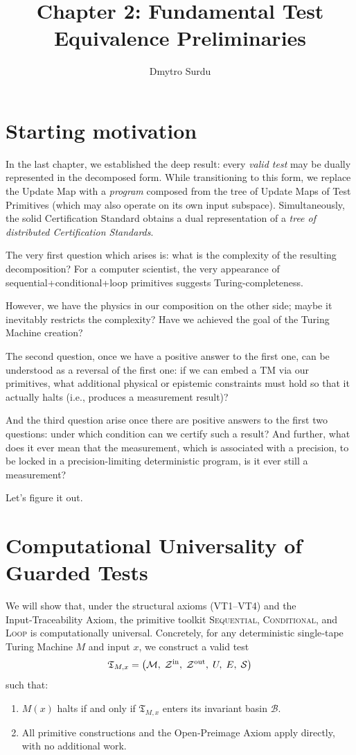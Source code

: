 \documentclass[12pt]{article}
\title{\textbf{Chapter 2: Fundamental Test Equivalence Preliminaries}}
\author{Dmytro Surdu}
\theoremstyle{definition}
\theoremstyle{plain}
\begin{document}
\maketitle

\section{Starting motivation}
In the last chapter, we established the deep result: every \emph{valid test} may be dually represented in the decomposed form. While transitioning to this form, we replace the Update Map with a \emph{program} composed from the tree of Update Maps of Test Primitives (which may also operate on its own input subspace). Simultaneously, the solid Certification Standard obtains a dual representation of a \emph{tree of distributed Certification Standards}.

The very first question which arises is: what is the complexity of the resulting decomposition? For a computer scientist, the very appearance of sequential+conditional+loop primitives suggests Turing-completeness. 

However, we have the physics in our composition on the other side; maybe it inevitably restricts the complexity? Have we achieved the goal of the Turing Machine creation?

The second question, once we have a positive answer to the first one, can be understood as a reversal of the first one: if we can embed a TM via our primitives, what additional physical or epistemic constraints must hold so that it actually halts (i.e., produces a measurement result)?

And the third question arise once there are positive answers to the first two questions: under which condition can we certify such a result? And further, what does it ever mean that the measurement, which is associated with a precision, to be locked in a precision-limiting deterministic program, is it ever still a measurement?

Let's figure it out.


\section{Computational Universality of Guarded Tests}
\label{sec:turing-complete-tests}

We will show that, under the structural axioms (VT1–VT4) and the Input‑Traceability Axiom, the primitive toolkit \textsc{Sequential}, \textsc{Conditional}, and \textsc{Loop} is computationally universal.  Concretely, for any deterministic single‑tape Turing Machine \(M\) and input \(x\), we construct a valid test
\[
  \mathfrak T_{M,x} = \bigl(\mathcal M,\;\mathcal Z^{\rm in},\;\mathcal Z^{\rm out},\;U,\;E,\;\mathcal S\bigr)
\]
such that:
\begin{enumerate}
  \item \(M(x)\) halts if and only if \(\mathfrak T_{M,x}\) enters its invariant basin \(\mathcal B\).
  \item All primitive constructions and the Open‑Preimage Axiom apply directly, with no additional work.
\end{enumerate}
\end{document}
